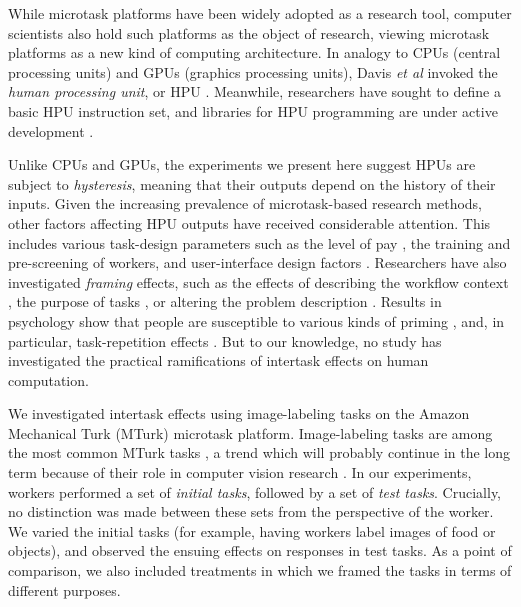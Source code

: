 \documentclass[12pt]{article}
\begin{document}
While microtask platforms have been widely adopted as a research tool,
computer scientists also hold such platforms as the object of 
research, viewing  microtask platforms as a new kind of computing 
architecture.  In analogy to CPUs (central 
processing units) and GPUs (graphics processing units), 
Davis \textit{et al} invoked the \textit{human processing unit}, or HPU \cite{5543192}.
Meanwhile, researchers have sought to define a basic HPU instruction set, and
libraries for HPU programming are under active development
 \cite{little2010turkit,minder2011crowdlang,minder2012crowdlang,kittur2011crowdforge}.  

Unlike CPUs and GPUs, the experiments we present here suggest HPUs
are subject to \textit{hysteresis}, meaning that their outputs depend
on the history of their inputs.  Given the
increasing prevalence of microtask-based research methods, other factors 
affecting HPU outputs have received considerable attention.
This includes various task-design parameters such as the level of 
pay \cite{kazai2013analysis}, the training \cite{le2010ensuring} and 
pre-screening \cite{paolacci2010running} of workers, and user-interface 
design factors \cite{Finnerty2013}.  
Researchers have also investigated \textit{framing} effects, 
such as the effects of describing the workflow context 
\cite{Kinnaird2012281}, the purpose of tasks 
\cite{chandler2013breaking}, or altering the problem description
\cite{thibodeau2013natural}.  Results in psychology show that people are 
susceptible to various kinds of priming 
\cite{BJOP1796,No2007,beller1971priming}, and, in particular, 
task-repetition effects \cite{Gass1999549,sohn2001task}.  But to our 
knowledge, no study has investigated the practical ramifications 
of intertask effects on human computation.

We investigated intertask effects using image-labeling tasks on the Amazon 
Mechanical Turk (MTurk) microtask platform.  Image-labeling tasks are among
the most common MTurk tasks \cite{chandler2013breaking,Berinsky2012351,Finnerty2013,paolacci2010running}, a trend which will probably continue 
in the long term because of their role in computer vision research 
\cite{5543192}.
In our experiments, workers performed a set of \textit{initial tasks}, 
followed by a set of \textit{test tasks}. Crucially, no distinction was
made between these sets from the perspective of the worker. We varied the 
initial tasks (for example, having workers label images of food or objects), 
and observed the ensuing effects on responses in test tasks.  
As a point of 
comparison, we also included treatments in which we framed the tasks in terms 
of different purposes.
\end{document}
